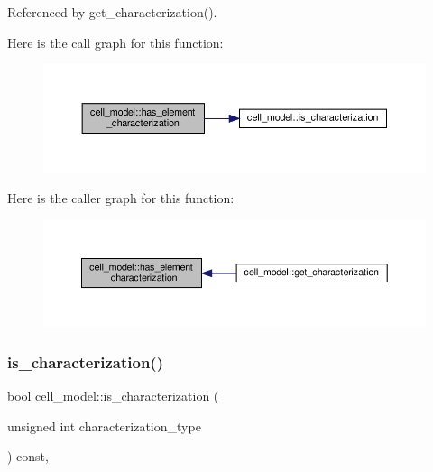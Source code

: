 Referenced by get\+\_\+characterization().

Here is the call graph for this function\+:
\nopagebreak
\begin{figure}[H]
\begin{center}
\leavevmode
\includegraphics[width=350pt]{d6/dcd/classcell__model_aa157ea9e89fee28a46ffcca9ebf2304a_cgraph}
\end{center}
\end{figure}
Here is the caller graph for this function\+:
\nopagebreak
\begin{figure}[H]
\begin{center}
\leavevmode
\includegraphics[width=350pt]{d6/dcd/classcell__model_aa157ea9e89fee28a46ffcca9ebf2304a_icgraph}
\end{center}
\end{figure}
\mbox{\label{classcell__model_a96569fa865d6362be6e405ca34a46205}} 
\subsubsection{\texorpdfstring{is\+\_\+characterization()}{is\_characterization()}}
{\footnotesize\ttfamily bool cell\+\_\+model\+::is\+\_\+characterization (\begin{DoxyParamCaption}\item[{unsigned int}]{characterization\+\_\+type }\end{DoxyParamCaption}) const\hspace{0.3cm}{\ttfamily [override]}, {\ttfamily [virtual]}}



